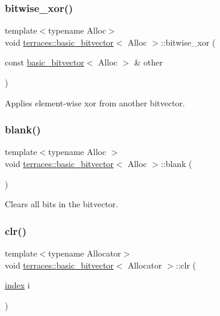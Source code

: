 \mbox{\label{classterraces_1_1basic__bitvector_ac21b3d7ece4c87cfc4967d7fefb55c54}} 
\subsubsection{\texorpdfstring{bitwise\+\_\+xor()}{bitwise\_xor()}}
{\footnotesize\ttfamily template$<$typename Alloc$>$ \\
void \hyperlink{classterraces_1_1basic__bitvector}{terraces\+::basic\+\_\+bitvector}$<$ Alloc $>$\+::bitwise\+\_\+xor (\begin{DoxyParamCaption}\item[{const \hyperlink{classterraces_1_1basic__bitvector}{basic\+\_\+bitvector}$<$ Alloc $>$ \&}]{other }\end{DoxyParamCaption})}

Applies element-\/wise xor from another bitvector. \mbox{\label{classterraces_1_1basic__bitvector_aa52688df4fe89e58f1e45b41faf7e068}} 
\subsubsection{\texorpdfstring{blank()}{blank()}}
{\footnotesize\ttfamily template$<$typename Alloc $>$ \\
void \hyperlink{classterraces_1_1basic__bitvector}{terraces\+::basic\+\_\+bitvector}$<$ Alloc $>$\+::blank (\begin{DoxyParamCaption}{ }\end{DoxyParamCaption})}

Clears all bits in the bitvector. \mbox{\label{classterraces_1_1basic__bitvector_a9701e586ebb927deaec8bbff3461c22a}} 
\subsubsection{\texorpdfstring{clr()}{clr()}}
{\footnotesize\ttfamily template$<$typename Allocator$>$ \\
void \hyperlink{classterraces_1_1basic__bitvector}{terraces\+::basic\+\_\+bitvector}$<$ Allocator $>$\+::clr (\begin{DoxyParamCaption}\item[{\hyperlink{namespaceterraces_adbc33ccb543d1634e96d0eb02e472c77}{index}}]{i }\end{DoxyParamCaption})\hspace{0.3cm}{\ttfamily [inline]}}

